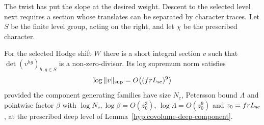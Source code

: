 The twist has put the slope at the desired weight. Descent to the selected level next
requires a section whose translates can be separated by character traces. Let \(S\) be
the finite level group, acting on the right, and let \(\chi\) be the prescribed
character.
\begin{lemma}
\label{lem:deep-short-orbit-section}
For the selected Hodge shift \(W\) there is a short integral
section \(v\) such that \(\det(v^{hg})_{h,g\in S}\) is a
non-zero-divisor. Its log supremum norm satisfies
\[
 \log\|v\|_{\sup}=O\big((frL_{\rm sc})^9\big)
\]
provided the component generating families have size \(N_c\),
Petersson bound \(\Lambda\) and pointwise factor \(\beta\) with
\(\log N_c,\log\beta=O(z_0^3)\), \(\log\Lambda=O(z_0^9)\) and
\(z_0=frL_{\rm sc}\), at the prescribed deep level of
Lemma~\ref{hyp:covolume-deep-component}.
\end{lemma}

